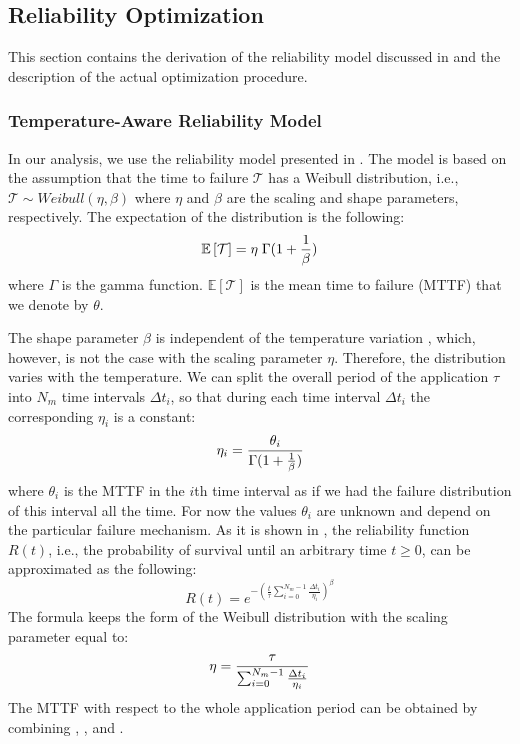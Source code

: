 \subsection{Reliability Optimization} 

This section contains the derivation of the reliability model discussed in
 and the description of the actual optimization procedure.

\subsubsection{Temperature-Aware Reliability Model}

In our analysis, we use the reliability model presented in \cite{huang2009,
xiang2010}. The model is based on the assumption that the time to failure
$\mathcal{T}$ has a Weibull distribution, i.e., $\mathcal{T} \sim Weibull(\eta,
\beta)$ where $\eta$ and $\beta$ are the scaling and shape parameters,
respectively. The expectation of the distribution is the following:
\begin{equation} \elab{general-mttf}
  \mathbb{E}\left[\mathcal{T}\right] = \eta \; \Gamma(1 + \frac{1}{\beta})
\end{equation}
where $\Gamma$ is the gamma function. $\mathbb{E}\left[\mathcal{T}\right]$ is
the mean time to failure (MTTF) that we denote by $\theta$.

The shape parameter $\beta$ is independent of the temperature variation
\cite{chang2006}, which, however, is not the case with the scaling parameter
$\eta$. Therefore, the distribution varies with the temperature. We can split
the overall period of the application $\tau$ into $N_m$ time intervals $\Delta
t_i$, so that during each time interval $\Delta t_i$ the corresponding $\eta_i$
is a constant:
\begin{equation} \elab{eta-one}
  \eta_i = \frac{\theta_i}{\Gamma(1 + \frac{1}{\beta})}
\end{equation}
where $\theta_i$ is the MTTF in the $i$th time interval as if we had the failure
distribution of this interval all the time. For now the values $\theta_i$ are
unknown and depend on the particular failure mechanism. As it is shown in
\cite{xiang2010}, the reliability function $R(t)$, i.e., the probability of
survival until an arbitrary time $t \geq 0$, can be approximated as the
following:
\[
  R(t) = e^{-(\frac{t}{\tau} \sum_{i=0}^{N_m - 1} \frac{\Delta t_i}{\eta_i})^\beta}
\]
The formula keeps the form of the Weibull distribution with the scaling
parameter equal to:
\begin{equation} \elab{eta-many}
  \eta = \frac{\tau}{\sum_{i=0}^{N_m - 1} \frac{\Delta t_i}{\eta_i}}
\end{equation}
The MTTF with respect to the whole application period can be obtained by
combining , , and .


